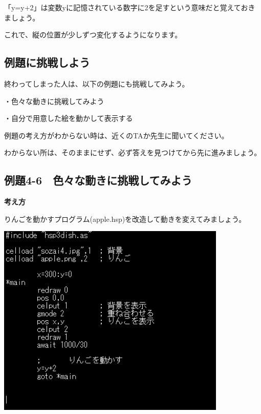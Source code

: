 \documentclass[a4paper,12pt]{jarticle}
\begin{document}
\bigskip

「y=y+2」は変数yに記憶されている数字に2を足すという意味だと覚えておきましょう。

これで、縦の位置が少しずつ変化するようになります。


\bigskip
\bigskip
\bigskip

\subsection{例題に挑戦しよう}

\bigskip
\bigskip

終わってしまった人は、以下の例題にも挑戦してみよう。

\bigskip

・色々な動きに挑戦してみよう

・自分で用意した絵を動かして表示する


\bigskip

例題の考え方がわからない時は、近くのTAか先生に聞いてください。

わからない所は、そのままにせず、必ず答えを見つけてから先に進みましょう。

\clearpage
\subsection{例題4-6　色々な動きに挑戦してみよう}
\bigskip
\bigskip

{\bfseries
考え方}

\bigskip

りんごを動かすプログラム(apple.hsp)を改造して動きを変えてみましょう。

\bigskip
\bigskip

\begin{minipage}{9.781cm}
\centering
{\upshape
\includegraphics[keepaspectratio,width=10.954cm,height=9.213cm]{text04-img/text04-img020.png}}
\end{minipage}
\end{document}
